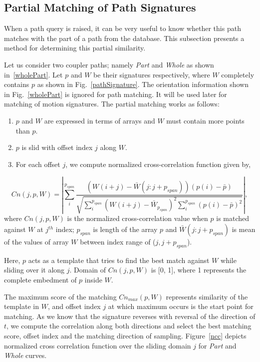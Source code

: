 \documentclass[twocolumn,10pt]{asme2e}
\begin{document}
\subsection{Partial Matching of Path Signatures}\label{sec_ncc}
When a path query is raised, it can be very useful to know whether this path matches with the part of a path from the database.
This subsection presents a method for determining this partial similarity.

Let us consider two coupler paths; namely \emph{Part} and \emph{Whole} as shown in~\ref{wholePart}.
Let $p$ and $W$ be their signatures respectively, where $W$ completely contains $p$ as shown in Fig.~\ref{pathSignature}.
The orientation information shown in Fig.~\ref{wholePart} is ignored for path matching. It will be used later for matching of motion signatures.
The partial matching works as follows:

\begin{enumerate}
  \item $p$ and $W$ are expressed in terms of arrays and $W$ must contain more points than $p$.
  \item $p$ is slid with offset index $j$ along $W$.
  \item For each offset $j$, we compute normalized cross-correlation\cite{lewis1995fast} function given by,
\end{enumerate}
\vspace{-0.6cm}
\begin{equation}\label{nccEq}
  Cn(j, p, W) = |\sum_{i}^{p_{span}} \frac{(W(i+j) - \bar{W}(j : j + p_{span}))(p(i) - \bar{p})}{\sqrt{\sum_{i}^{p_{span}}{(W(i+j) - \bar{W}_{p_{span}})}^2\sum_{i}^{p_{span}}{(p(i) - \bar{p})}^2}} |,
\end{equation}
where $Cn(j, p, W)$ is the normalized cross-correlation value when $p$ is matched against $W$ at $j^{th}$ index; $p_{span}$ is length of the array $p$ and $\bar{W}(j:j + p_{span})$ is mean of the values of array $W$ between index range of ($j, j+p_{span}$).

Here, $p$ acts as a template that tries to find the best match against $W$ while sliding over it along $j$.
Domain of $Cn(j, p, W)$ is [0, 1], where 1 represents the complete embedment of $p$ inside $W$.

The maximum score of the matching $Cn_{max}(p, W)$ represents similarity of the template in $W$, and offset index $j$ at which maximum occurs is the start point for matching.
As we know that the signature reverses with reversal of the direction of $t$, we compute the correlation along both directions and select the best matching score, offset index and the matching direction of sampling.
Figure~\ref{ncc} depicts normalized cross correlation function over the sliding domain $j$ for \emph{Part} and \emph{Whole} curves.
\end{document}
